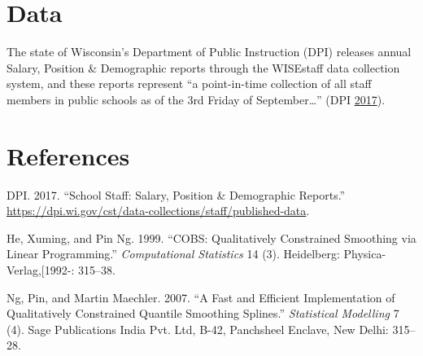 \documentclass[]{article}
\begin{document}
\section{Data}\label{data}

The state of Wisconsin's Department of Public Instruction (DPI) releases
annual Salary, Position \& Demographic reports through the WISEstaff
data collection system, and these reports represent ``a point-in-time
collection of all staff members in public schools as of the 3rd Friday
of September\ldots{}'' (DPI \protect\hyperlink{ref-dpi}{2017}).

\section{References}\label{references}



\hypertarget{refs}{}
\hypertarget{ref-dpi}{}
DPI. 2017. ``School Staff: Salary, Position \& Demographic Reports.''
\url{https://dpi.wi.gov/cst/data-collections/staff/published-data}.

\hypertarget{ref-he}{}
He, Xuming, and Pin Ng. 1999. ``COBS: Qualitatively Constrained
Smoothing via Linear Programming.'' \emph{Computational Statistics} 14
(3). Heidelberg: Physica-Verlag,{[}1992-: 315--38.

\hypertarget{ref-ng}{}
Ng, Pin, and Martin Maechler. 2007. ``A Fast and Efficient
Implementation of Qualitatively Constrained Quantile Smoothing
Splines.'' \emph{Statistical Modelling} 7 (4). Sage Publications India
Pvt. Ltd, B-42, Panchsheel Enclave, New Delhi: 315--28.
\end{document}
